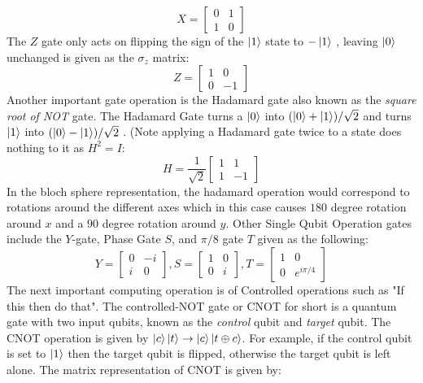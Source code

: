 \begin{equation}
    X = \begin{bmatrix} 
    0 & 1 \\
    1 & 0 \end{bmatrix}
\end{equation}
The $Z$ gate only acts on flipping the sign of the $\ket{1}$ state to $-\ket{1}$ , leaving $\ket{0}$ unchanged is given as the $\sigma_{z}$ matrix: 
\begin{equation}
    Z = \begin{bmatrix}
    1 & 0 \\
    0 & -1 \end{bmatrix}
\end{equation} 
Another important gate operation is the Hadamard gate also known as the \textit{square root of NOT} gate. The Hadamard Gate turns a $\ket{0}$ into $(\ket{0} + \ket{1})/\sqrt{2}$ and turns $\ket{1}$ into $(\ket{0} - \ket{1})/\sqrt{2}$ . (Note applying a Hadamard gate twice to a state does nothing to it as $H^2 = I$: 
\begin{equation}
    H = \frac{1}{\sqrt{2}}
    \begin{bmatrix}
    1 & 1 \\
    1 & -1 \end{bmatrix}
\end{equation}
In the bloch sphere representation, the hadamard operation would correspond to rotations around the different axes which in this case causes $180$ degree rotation around $x$ and a $90$ degree rotation around $y$. \newline
Other Single Qubit Operation gates include the $Y$-gate, Phase Gate $S$, and $\pi / 8$ gate $T$ given as the following:
\begin{equation}
    Y = 
    \begin{bmatrix}
    0 & -i \\
    i & 0 
    \end{bmatrix}
    , 
    S = 
    \begin{bmatrix}
    1 & 0 \\
    0 & i 
    \end{bmatrix}
    ,
    T = 
    \begin{bmatrix}
    1 & 0 \\
    0 & e^{i\pi/4}
    \end{bmatrix}
\end{equation}
The next important computing operation is of Controlled operations such as "If this then do that". The controlled-NOT gate or CNOT for short is a quantum gate with two input qubits, known as the \textit{control} qubit and \textit{target} qubit. The CNOT operation is given by $\ket{c}\ket{t} \rightarrow \ket{c} \ket{t \oplus c}$. For example, if the control qubit is set to $\ket{1}$ then the target qubit is flipped, otherwise the target qubit is left alone. The matrix representation of CNOT is given by: 
